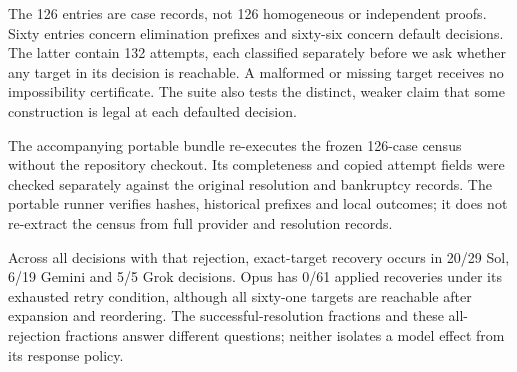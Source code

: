 
\caption{All sixty eliminations, plotted by current debt and the nominal
own-finance upper bound. Fifty-six bounds lie below debt. Three other cases have
engine-executed payment witnesses. In G7, the bound is \$1,310 but the exhaustive
mortgage-only continuation reaches only \$440 against \$750 owed; the separate
marker and segment show this gap. Circles denote declarations and squares
automatic eliminations. The classifications do not assert that every nominal
bound is attainable, that payment is optimal, or that an alternative route
changes the eventual winner.}

The 126 entries are case records, not 126 homogeneous or independent proofs.
Sixty entries concern elimination prefixes and sixty-six concern default
decisions. The latter contain 132 attempts, each classified separately before
we ask whether any target in its decision is reachable. A malformed or missing
target receives no impossibility certificate. The suite also tests the distinct,
weaker claim that some construction is legal at each defaulted decision.

The accompanying portable bundle re-executes the frozen 126-case census without
the repository checkout. Its completeness and copied attempt fields were checked
separately against the original resolution and bankruptcy records. The portable
runner verifies hashes, historical prefixes and local outcomes; it does not
re-extract the census from full provider and resolution records.

Across all decisions with that rejection, exact-target recovery occurs in
20/29 Sol, 6/19 Gemini and 5/5 Grok decisions. Opus has 0/61 applied recoveries
under its exhausted retry condition, although all sixty-one targets are reachable
after expansion and reordering. The successful-resolution fractions and these
all-rejection fractions answer different questions; neither isolates a model
effect from its response policy.

